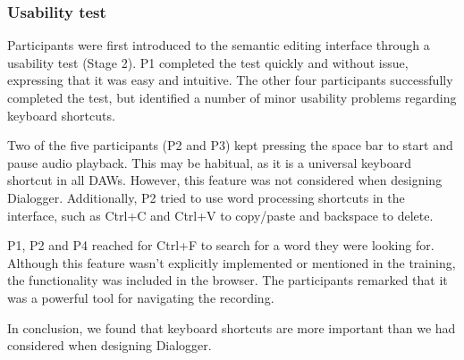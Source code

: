 

\subsubsection{Usability test}
Participants were first introduced to the semantic editing interface through a usability test (Stage 2). P1 completed
the test quickly and without issue, expressing that it was easy and intuitive. The other four participants successfully
completed the test, but identified a number of minor usability problems regarding keyboard shortcuts.

Two of the five participants (P2 and P3) kept pressing the space bar to start and pause audio playback. This may be
habitual, as it is a universal keyboard shortcut in all DAWs. However, this feature was not considered when designing
Dialogger.  Additionally, P2 tried to use word processing shortcuts in the interface, such as Ctrl+C and Ctrl+V to
copy/paste and backspace to delete.

P1, P2 and P4 reached for Ctrl+F to search for a word they were looking for. Although this feature wasn't explicitly
implemented or mentioned in the training, the functionality was included in the browser. The participants remarked that
it was a powerful tool for navigating the recording.

In conclusion, we found that keyboard shortcuts are more important than we had considered when designing Dialogger.


